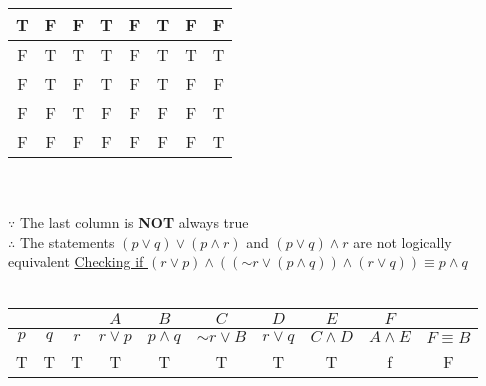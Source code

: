 \documentclass[a4paper,12pt]{article}
\newcommand*{\ltnot}{\mathord{\sim}}
\begin{document}
\begin{center}
{\begin{tabular}{|c c c|c|c|c|c|c|}
        \hline
        T                    & F                       & F                       & T                       & F                       & T                    & F           & F            \\
        \hline
        F                    & T                       & T                       & T                       & F                       & T                    & T           & T            \\
        \hline
        F                    & T                       & F                       & T                       & F                       & T                    & F           & F            \\
        \hline
        F                    & F                       & T                       & F                       & F                       & F                    & F           & T            \\
        \hline
        F                    & F                       & F                       & F                       & F                       & F                    & F           & T            \\
        \hline
    \end{tabular}}
    \ \\\ \\
    $\because$ The last column is \textbf{NOT} always true\\
    $\therefore$ The statements $(p \lor q) \lor (p \land r)$ and $(p \lor q) \land r$ are not logically equivalent
    \newpage
    \ul{Checking if $(r \lor p) \land ((\ltnot r \lor (p \land q)) \land (r \lor q)) \equiv p \land q$}\\\ \\
    {
    \begin{tabular}{|c c c|c|c|c|c|c|c|c|}
        \multicolumn{3}{c}{} & \multicolumn{1}{c}{$A$} & \multicolumn{1}{c}{$B$} & \multicolumn{1}{c}{$C$} & \multicolumn{1}{c}{$D$} & \multicolumn{1}{c}{$E$} & \multicolumn{1}{c}{$F$}                                            \\
        \hline
        $p$                  & $q$                     & $r$                     & $r \lor p$              & $p \land q$             & $\ltnot r \lor B$       & $r \lor q$              & $C \land D$ & $A \land E$ & $F \equiv B$ \\
        \hline
        T                    & T                       & T                       & T                       & T                       & T                       & T                       & T           & f           & F            \\

\end{tabular}}
\end{center}
\end{document}
